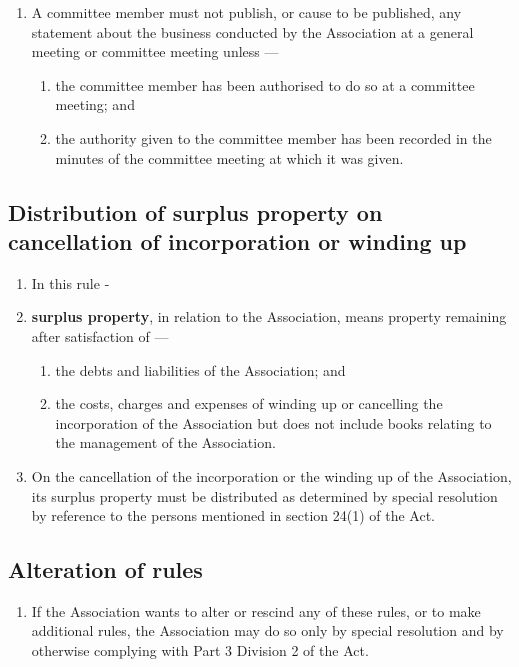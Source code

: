 \documentclass[../constitution.tex]{subfiles}
\begin{document}
\begin{enumerate}

\item A committee member must not publish, or cause to be published, any statement about the business conducted by the Association at a general meeting or committee meeting unless ---

  \begin{enumerate}
  
  \item the committee member has been authorised to do so at a committee meeting; and
  \item the authority given to the committee member has been recorded in the minutes of the committee meeting at which it was given.
  \end{enumerate}
\end{enumerate}

\hypertarget{distribution-of-surplus-property-on-cancellation-of-incorporation-or-winding-up}{%
\subsection{Distribution of surplus property on cancellation of incorporation or winding up}\label{distribution-of-surplus-property-on-cancellation-of-incorporation-or-winding-up}}

\begin{enumerate}

\item In this rule -
\item \textbf{surplus property}, in relation to the Association, means property remaining after satisfaction of ---

  \begin{enumerate}
  
  \item the debts and liabilities of the Association; and
  \item the costs, charges and expenses of winding up or cancelling the incorporation of the Association but does not include books relating to the management of the Association.
  \end{enumerate}
\item On the cancellation of the incorporation or the winding up of the Association, its surplus property must be distributed as determined by special resolution by reference to the persons mentioned in section 24(1) of the Act.
\end{enumerate}

\hypertarget{alteration-of-rules}{%
\subsection{Alteration of rules}\label{alteration-of-rules}}

\begin{enumerate}

\item If the Association wants to alter or rescind any of these rules, or to make additional rules, the Association may do so only by special resolution and by otherwise complying with Part 3 Division 2 of the Act.
\end{enumerate}
\end{document}

